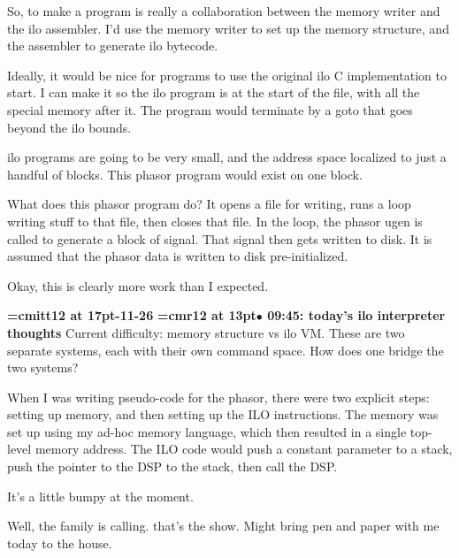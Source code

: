 So, to make a program is really a collaboration between the memory writer and the ilo assembler. I'd use the memory writer to set up the memory structure, and the assembler to generate ilo bytecode.
\par

Ideally, it would be nice for programs to use the original ilo C implementation to start. I can make it so the ilo program is at the start of the file, with all the special memory after it. The program would terminate by a goto that goes beyond the ilo bounds.
\par

ilo programs are going to be very small, and the address space localized to just a handful of blocks. This phasor program would exist on one block.
\par

What does this phasor program do? It opens a file for writing, runs a loop writing stuff to that file, then closes that file. In the loop, the phasor ugen is called to generate a block of signal. That signal then gets written to disk. It is assumed that the phasor data is written to disk pre-initialized.
\par

Okay, this is clearly more work than I expected.
\par

{\medskip\noindent\bf\font\titlefont=cmitt12 at 17pt-11-26}\medskip
{\smallskip\noindent\bf\font\titlefont=cmr12 at 13pt\titlefont $\bullet$ 09:45: today's ilo interpreter thoughts}\smallskip
Current difficulty: memory structure vs ilo VM. These are two separate systems, each with their own command space. How does one bridge the two systems?
\par

When I was writing pseudo-code for the phasor, there were two explicit steps: setting up memory, and then setting up the ILO instructions. The memory was set up using my ad-hoc memory language, which then resulted in a single top-level memory address. The ILO code would push a constant parameter to a stack, push the pointer to the DSP to the stack, then call the DSP.
\par

It's a little bumpy at the moment.
\par

Well, the family is calling. that's the show. Might bring pen and paper with me today to the house.
\par

